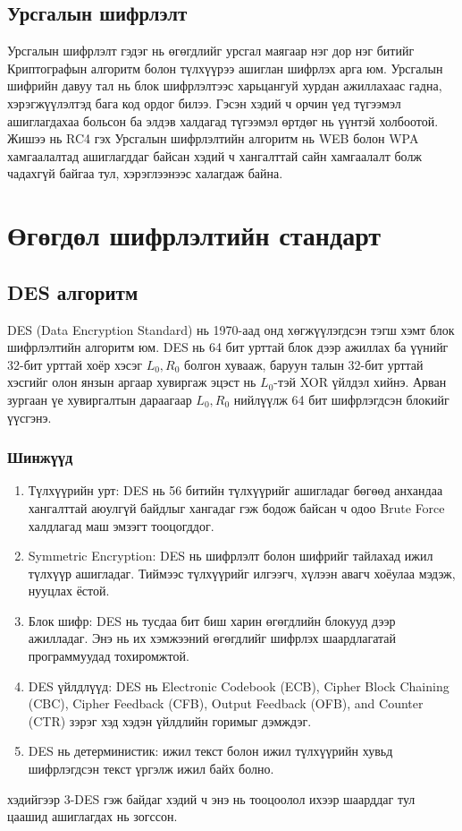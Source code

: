 \subsection{Урсгалын шифрлэлт}
Урсгалын шифрлэлт гэдэг нь өгөгдлийг урсгал маягаар нэг дор нэг битийг Криптографын алгоритм болон түлхүүрээ ашиглан шифрлэх арга юм. Урсгалын шифрийн давуу тал нь блок шифрлэлтээс харьцангуй хурдан ажиллахаас гадна, хэрэгжүүлэлтэд бага код ордог билээ. Гэсэн хэдий ч орчин үед түгээмэл ашиглагдахаа больсон ба элдэв халдагад түгээмэл өртдөг нь үүнтэй холбоотой. Жишээ нь RC4 гэх Урсгалын шифрлэлтийн алгоритм нь WEB болон WPA хамгаалалтад ашиглагддаг байсан хэдий ч хангалттай сайн хамгаалалт болж чадахгүй байгаа тул, хэрэглээнээс халагдаж байна.

\section{Өгөгдөл шифрлэлтийн стандарт}
\subsection{DES алгоритм}
DES (Data Encryption Standard) нь 1970-аад онд хөгжүүлэгдсэн тэгш хэмт блок шифрлэлтийн алгоритм юм. DES нь 64 бит урттай блок дээр ажиллах ба үүнийг 32-бит урттай хоёр хэсэг $L_{0}, R_{0}$ болгон хувааж, баруун талын 32-бит урттай хэсгийг олон янзын аргаар хувиргаж эцэст нь $L_{0}$-тэй XOR үйлдэл хийнэ. Арван зургаан үе хувиргалтын дараагаар $L_{0}, R_{0}$ нийлүүлж 64 бит шифрлэгдсэн блокийг үүсгэнэ.
\subsubsection{Шинжүүд}
\begin{enumerate}
	\item Түлхүүрийн урт: DES нь 56 битийн түлхүүрийг ашигладаг бөгөөд анхандаа хангалттай аюулгүй байдлыг хангадаг гэж бодож байсан ч одоо Brute Force халдлагад маш эмзэгт тооцогддог.
	\item Symmetric Encryption: DES нь шифрлэлт болон шифрийг тайлахад ижил түлхүүр ашигладаг. Тиймээс түлхүүрийг илгээгч, хүлээн авагч хоёулаа мэдэж, нууцлах ёстой.

	\item Блок шифр: DES нь тусдаа бит биш харин өгөгдлийн блокууд дээр ажилладаг. Энэ нь их хэмжээний өгөгдлийг шифрлэх шаардлагатай программуудад тохиромжтой.

	\item DES үйлдлүүд: DES нь  Electronic Codebook (ECB), Cipher Block Chaining (CBC), Cipher Feedback (CFB), Output Feedback (OFB), and Counter (CTR) зэрэг хэд хэдэн үйлдлийн горимыг дэмждэг.
	
	\item DES нь детерминистик: ижил текст болон ижил түлхүүрийн хувьд шифрлэгдсэн текст үргэлж ижил байх болно.
\end{enumerate}
хэдийгээр 3-DES гэж байдаг хэдий ч энэ нь тооцоолол ихээр шаарддаг тул цаашид ашиглагдах нь зогссон.

